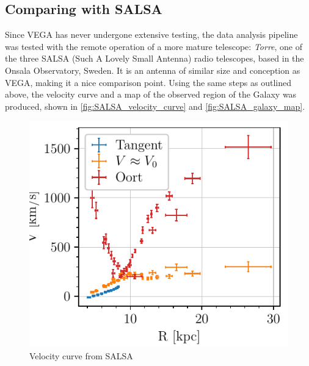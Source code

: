 \subsection{Comparing with SALSA}
Since VEGA  has never undergone extensive testing, the data analysis pipeline was tested with the remote operation of a more mature telescope: \emph{Torre}, one of the three SALSA (Such A Lovely Small Antenna) radio telescopes, based in the Onsala Observatory, Sweden.
It is an antenna of similar size and conception as VEGA, making it a nice comparison point. Using the same steps as outlined above, the velocity curve and a map of the observed region of the Galaxy was produced, shown in \autoref{fig:SALSA_velocity_curve} and \autoref{fig:SALSA_galaxy_map}.

\begin{figure}[htbp]
    \begin{minipage}[t]{0.5\textwidth}
        \centering
        \captionsetup{width=.95\textwidth}
        \includegraphics[scale=1]{figures/SALSA_velocity_curve.pdf}
        \caption{Velocity curve from SALSA}
        \label{fig:SALSA_velocity_curve}
    \end{minipage}
    \begin{minipage}[t]{0.5\textwidth}
        \centering
        \captionsetup{width=.95\textwidth}

\end{minipage}
\end{figure}
